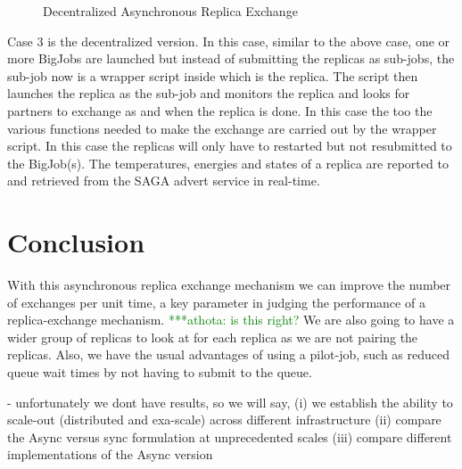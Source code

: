 \documentclass[a4paper,10pt]{article}
\newcommand{\athotanote}[1]{ {\textcolor{green} { ***athota: #1 }}}
\newcommand{\athotanote}[1]{}
\begin{document}
\begin{figure}
\centering


\caption{\small Decentralized Asynchronous Replica Exchange}
\label{fig:decentralized}
\end{figure}

Case 3 is the decentralized version. In this case, similar to the above case, one or more BigJobs are launched but instead of submitting the replicas as sub-jobs, the sub-job now is a wrapper script inside which is the replica. The script then launches the replica as the sub-job and monitors the replica and looks for partners to exchange as and when the replica is done. In this case the too the various functions needed to make the exchange are carried out by the wrapper script. In this case the replicas will only have to restarted but not resubmitted to the BigJob(s). The temperatures, energies and states of a replica are reported to and retrieved from the SAGA advert service in real-time.


\section{Conclusion}
With this asynchronous replica exchange mechanism we can improve the number of exchanges per unit time, 
a key parameter in judging the performance of a replica-exchange mechanism. \athotanote{is this right? } 
We are also going to have a wider group of replicas to look at for each replica as we are not pairing 
the replicas. Also, we have the usual advantages of using a pilot-job, such as reduced queue wait 
times by not having to submit to the queue. 


- unfortunately we dont have results, so we will say, (i) we establish the
 ability to scale-out (distributed and exa-scale)  across different
 infrastructure (ii) compare the Async versus sync formulation at
 unprecedented scales (iii) compare different implementations  of
 the Async version
 
 
  
 
\end{document}
